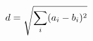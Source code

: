 \documentclass[preview]{standalone}
\begin{document}
\begin{align*}
\special{dvisvgm:raw <g id='unique000'>}d = \sqrt{\sum_{i}(a_i - b_i)^2}\special{dvisvgm:raw </g>}
\end{align*}
\end{document}
